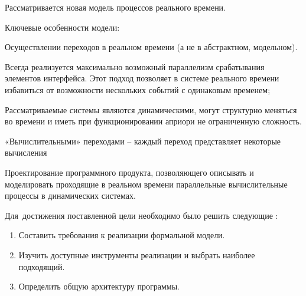 
{\actuality} Рассматривается новая модель процессов реального времени.  

Ключевые особенности модели: 

Осуществлении переходов в реальном времени (а не в абстрактном, модельном). 

Всегда реализуется максимально возможный параллелизм срабатывания элементов интерфейса. Этот подход позволяет в системе реального времени избавиться от возможности нескольких событий с одинаковым временем; 

Рассматриваемые системы являются динамическими, могут структурно меняться во времени и иметь при функционировании априори не ограниченную сложность. 

«Вычислительными» переходами – каждый переход представляет некоторые вычисления

{\aim} Проектирование программного продукта, позволяющего описывать и моделировать проходящие в реальном времени параллельные вычислительные процессы в динамических системах. 

Для~достижения поставленной цели необходимо было решить следующие {\tasks}:
\begin{enumerate}
  \item Составить требования к реализации формальной модели.
  \item Изучить доступные инструменты реализации и выбрать наиболее подходящий.
  \item Определить общую архитектуру программы.
\end{enumerate}
    

